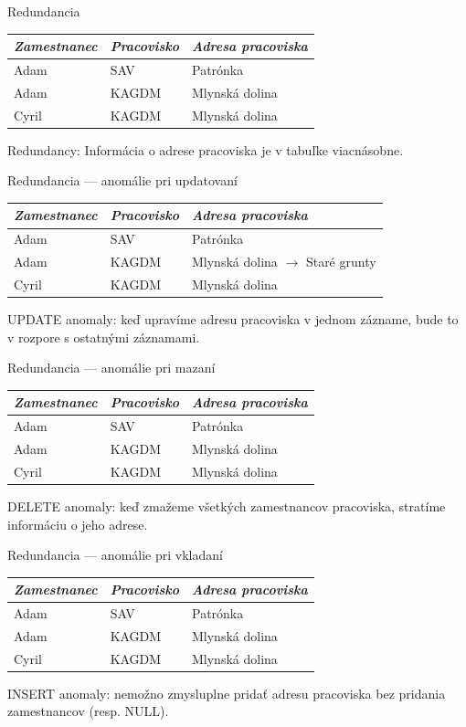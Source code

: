 \documentclass[12pt]{beamer}
\begin{document}
\begin{frame}[fragile]{Redundancia}
\begin{tabular}{|l|l|l|}
\hline
\emph{Zamestnanec} & \emph{Pracovisko} & \emph{Adresa pracoviska} \\\hline
Adam & SAV & Patrónka \\\hline
Adam & KAGDM & Mlynská dolina \\\hline
Cyril & KAGDM & Mlynská dolina \\\hline
\end{tabular}
\bigskip

\alert{Redundancy}: Informácia o adrese pracoviska je v tabuľke viacnásobne.
\end{frame}

\begin{frame}[fragile]{Redundancia --- anomálie pri updatovaní}
\begin{tabular}{|l|l|l|}
\hline
\emph{Zamestnanec} & \emph{Pracovisko} & \emph{Adresa pracoviska} \\\hline
Adam & SAV & Patrónka \\\hline
Adam & KAGDM & Mlynská dolina \alert{$\rightarrow$ Staré grunty}\\\hline
Cyril & KAGDM & Mlynská dolina \\\hline
\end{tabular}
\bigskip

\alert{UPDATE anomaly}: keď upravíme adresu pracoviska v jednom zázname, bude to v rozpore s ostatnými záznamami.
\end{frame}

\begin{frame}[fragile]{Redundancia --- anomálie pri mazaní}
\begin{tabular}{|l|l|l|}
\hline
\emph{Zamestnanec} & \emph{Pracovisko} & \emph{Adresa pracoviska} \\\hline
Adam & SAV & Patrónka \\\hline
Adam & KAGDM & Mlynská dolina \\\hline
Cyril & KAGDM & Mlynská dolina \\\hline
\end{tabular}
\bigskip

\alert{DELETE anomaly}: keď zmažeme všetkých zamestnancov pracoviska, stratíme informáciu o jeho adrese.
\end{frame}

\begin{frame}[fragile]{Redundancia --- anomálie pri vkladaní}
\begin{tabular}{|l|l|l|}
\hline
\emph{Zamestnanec} & \emph{Pracovisko} & \emph{Adresa pracoviska} \\\hline
Adam & SAV & Patrónka \\\hline
Adam & KAGDM & Mlynská dolina \\\hline
Cyril & KAGDM & Mlynská dolina \\\hline
\end{tabular}
\bigskip

\alert{INSERT anomaly}: nemožno zmysluplne pridať adresu pracoviska bez pridania zamestnancov (resp. NULL).
\end{frame}
\end{document}
